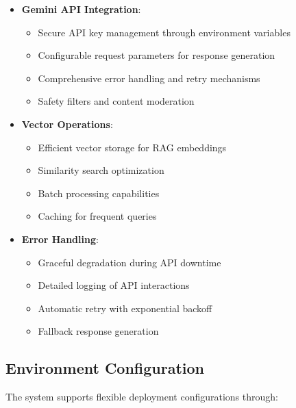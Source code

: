 \begin{itemize}
  \item \textbf{Gemini API Integration}:
    \begin{itemize}
      \item Secure API key management through environment variables
      \item Configurable request parameters for response generation
      \item Comprehensive error handling and retry mechanisms
      \item Safety filters and content moderation
    \end{itemize}
    
  \item \textbf{Vector Operations}:
    \begin{itemize}
      \item Efficient vector storage for RAG embeddings
      \item Similarity search optimization
      \item Batch processing capabilities
      \item Caching for frequent queries
    \end{itemize}
    
  \item \textbf{Error Handling}:
    \begin{itemize}
      \item Graceful degradation during API downtime
      \item Detailed logging of API interactions
      \item Automatic retry with exponential backoff
      \item Fallback response generation
    \end{itemize}
\end{itemize}

\subsection{Environment Configuration}
The system supports flexible deployment configurations through:


